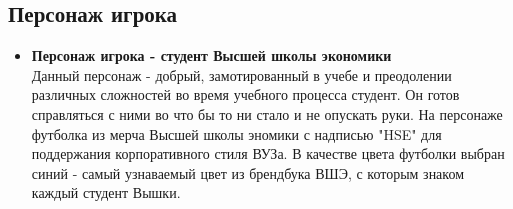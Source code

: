 \documentclass{article}
\begin{document}
\subsection*{Персонаж игрока}

\begin{itemize}
    \item \textbf{Персонаж игрока - студент Высшей школы экономики} \\
    Данный персонаж - добрый, замотированный в учебе и преодолении различных сложностей во время учебного процесса студент. Он готов справляться с ними во что бы то ни стало и не опускать руки. На персонаже футболка из мерча Высшей школы эномики с надписью "HSE" для поддержания корпоративного стиля ВУЗа. В качестве цвета футболки выбран синий - самый узнаваемый цвет из брендбука ВШЭ, с которым знаком каждый студент Вышки. 

\end{itemize}
\end{document}
